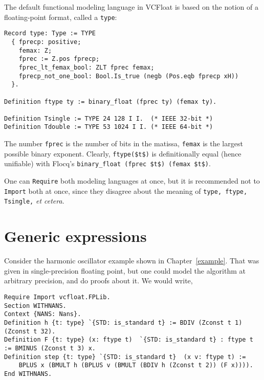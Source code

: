 \documentclass[article]{memoir}
\begin{document}
The default functional modeling language in VCFloat is based on the notion of a floating-point format, called a \lstinline{type}:
\begin{lstlisting}
Record type: Type := TYPE
  { fprecp: positive;
    femax: Z;
    fprec := Z.pos fprecp;
    fprec_lt_femax_bool: ZLT fprec femax;
    fprecp_not_one_bool: Bool.Is_true (negb (Pos.eqb fprecp xH))
  }.

Definition ftype ty := binary_float (fprec ty) (femax ty).

Definition Tsingle := TYPE 24 128 I I.  (* IEEE 32-bit *)
Definition Tdouble := TYPE 53 1024 I I. (* IEEE 64-bit *)
\end{lstlisting}
The number \lstinline{fprec} is the number of bits in the matissa, \lstinline{femax} is the largest possible binary exponent.  
Clearly, \lstinline{ftype($t$)} is definitionally equal (hence unifiable) with 
Flocq's  \lstinline{binary_float (fprec $t$) (femax $t$)}.

One can \lstinline{Require} both modeling languages at once, but it is recommended not to \lstinline{Import} both at once,
since they disagree about the meaning of \lstinline{type, ftype, Tsingle,} \emph{et cetera}.

\chapter{Generic expressions}
\label{generic}

Consider the harmonic oscillator example shown in Chapter~\ref{example}.  That was given in single-precision floating point, but
one could model the algorithm at arbitrary precision, and do proofs about it.  We would write,

\begin{lstlisting}
Require Import vcfloat.FPLib.
Section WITHNANS.
Context {NANS: Nans}.
Definition h {t: type} `{STD: is_standard t} := BDIV (Zconst t 1) (Zconst t 32).
Definition F {t: type} (x: ftype t)  `{STD: is_standard t} : ftype t := BMINUS (Zconst t 3) x.
Definition step {t: type} `{STD: is_standard t}  (x v: ftype t) :=
    BPLUS x (BMULT h (BPLUS v (BMULT (BDIV h (Zconst t 2)) (F x)))).
End WITHNANS.
\end{lstlisting}
  
\end{document}
